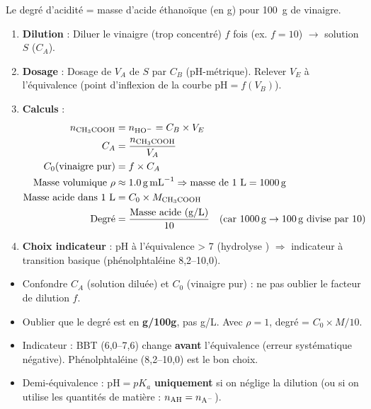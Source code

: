 \documentclass[11pt]{article}
\begin{document}
\begin{methode}
Le degré d'acidité = masse d'acide éthanoïque (en g) pour \SI{100}{g} de vinaigre.
\begin{enumerate}
\item \textbf{Dilution} : Diluer le vinaigre (trop concentré) $f$ fois (ex. $f=10$) $\rightarrow$ solution $S$ ($C_A$).
\item \textbf{Dosage} : Dosage de $V_A$ de $S$ par  $C_B$ (pH-métrique). Relever $V_E$ à l'équivalence (point d'inflexion de la courbe $\mathrm{pH} = f(V_B)$).
\item \textbf{Calculs} :
    \begin{align*}
    n_{\ce{CH3COOH}} &= n_{\ce{HO-}} = C_B \times V_E \\
    C_A &= \frac{n_{\ce{CH3COOH}}}{V_A} \\
    C_0 (\text{vinaigre pur}) &= f \times C_A \\
    \text{Masse volumique } \rho &\approx \SI{1,0}{g.mL^{-1}} \Rightarrow \text{masse de 1 L} = \SI{1000}{g} \\
    \text{Masse acide dans 1 L} &= C_0 \times M_{\ce{CH3COOH}} \\
    \text{Degré} &= \frac{\text{Masse acide (g/L)}}{10} \quad (\text{car } \SI{1000}{g} \rightarrow \SI{100}{g} \text{ divise par 10})
    \end{align*}
\item \textbf{Choix indicateur} : pH à l'équivalence > 7 (hydrolyse ) $\Rightarrow$ indicateur à transition basique (phénolphtaléine 8,2--10,0).
\end{enumerate}
\end{methode}

\begin{attention}
\begin{itemize}
\item Confondre $C_A$ (solution diluée) et $C_0$ (vinaigre pur) : ne pas oublier le facteur de dilution $f$.
\item Oublier que le degré est en \textbf{g/100g}, pas g/L. Avec $\rho=1$, degré = $C_0 \times M / 10$.
\item Indicateur : BBT (6,0--7,6) change \textbf{avant} l'équivalence (erreur systématique négative). Phénolphtaléine (8,2--10,0) est le bon choix.
\item Demi-équivalence : $\mathrm{pH} = pK_a$ \textbf{uniquement} si on néglige la dilution (ou si on utilise les quantités de matière : $n_{\ce{AH}} = n_{\ce{A-}}$).
\end{itemize}
\end{attention}
\end{document}
